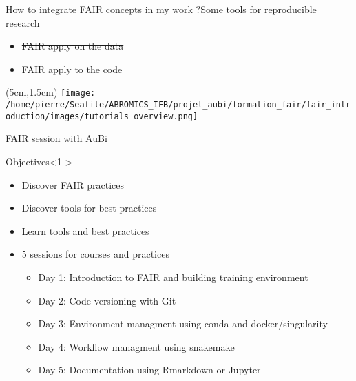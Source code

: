 \begin{frame}{How to integrate FAIR concepts in my work ?}{Some tools for reproducible research}
\begin{itemize}
\item {\sout{\color{gray} FAIR apply on the data}}
\item FAIR apply to the code
\end{itemize}
\begin{textblock*}{15cm}(5cm,1.5cm) %
\texttt{[image: /home/pierre/Seafile/ABROMICS\_IFB/projet\_aubi/formation\_fair/fair\_introduction/images/tutorials\_overview.png]}
\end{textblock*}
\end{frame}

\begin{frame}{FAIR session with AuBi}
\begin{block}{Objectives}<1->
\begin{itemize}
\item Discover FAIR practices
\item Discover tools for best practices
\item Learn tools and best practices
\item<2-> 5 sessions for courses and practices
	\begin{itemize}[<2->]
	\item Day 1: Introduction to FAIR and building training environment
	\item Day 2: Code versioning with Git
	\item Day 3: Environment managment using conda and docker/singularity
	\item Day 4: Workflow managment using snakemake
	\item Day 5: Documentation using Rmarkdown or Jupyter
	\end{itemize}
\end{itemize}
\end{block}
\end{frame}

